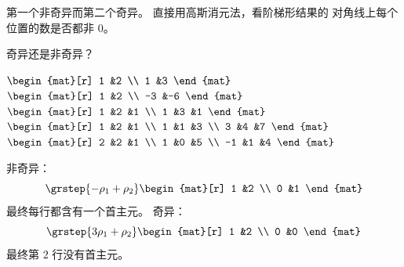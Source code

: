 \begin{exercises}
\begin{answer}
       第一个非奇异而第二个奇异。
       直接用高斯消元法，看阶梯形结果的
       对角线上每个位置的数是否都非 $0$。
     \end{answer}
  \recommended \item
    奇异还是非奇异？
    \begin{exparts*}
      \partsitem \(
        \begin{mat}[r]
          1  &2  \\
          1  &3
        \end{mat}   \)
      \partsitem \(
        \begin{mat}[r]
          1  &2  \\
         -3  &-6
        \end{mat}   \)
      \partsitem \(
        \begin{mat}[r]
          1  &2  &1  \\
          1  &3  &1
        \end{mat}   \)
      \partsitem \(
        \begin{mat}[r]
          1  &2  &1  \\
          1  &1  &3  \\
          3  &4  &7
        \end{mat}   \)
      \partsitem \(
        \begin{mat}[r]
          2  &2  &1  \\
          1  &0  &5  \\
         -1  &1  &4
        \end{mat}   \)
    \end{exparts*}
    \begin{answer}
      \begin{exparts}
      \partsitem 非奇异：
        \begin{equation*}
          \grstep{-\rho_1+\rho_2}
          \begin{mat}[r]
            1  &2  \\
            0  &1
          \end{mat}
        \end{equation*}
        最终每行都含有一个首主元。
      \partsitem 奇异：
        \begin{equation*}
          \grstep{3\rho_1+\rho_2}
          \begin{mat}[r]
            1  &2  \\
            0  &0
          \end{mat}
        \end{equation*}
        最终第 \( 2 \) 行没有首主元。

\end{exparts}
\end{answer}
\end{exercises}
